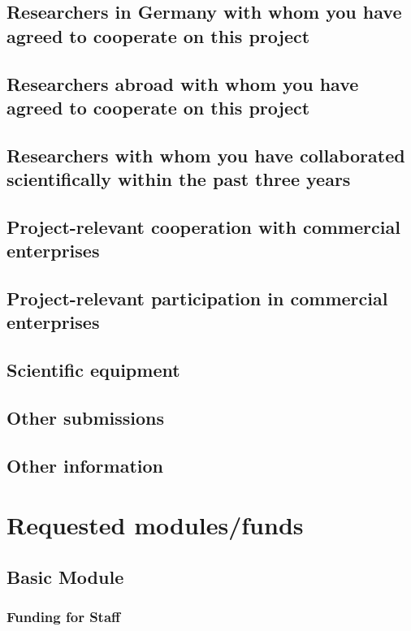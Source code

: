 \documentclass{scrartcl}
\begin{document}
\subsection{Researchers in Germany with whom you have agreed to cooperate on this project}

\subsection{Researchers abroad with whom you have agreed to cooperate on this project}

\subsection{Researchers with whom you have collaborated scientifically within the past three years}

\subsection{Project-relevant cooperation with commercial enterprises}

\subsection{Project-relevant participation in commercial enterprises}

\subsection{Scientific equipment}

\subsection{Other submissions}

\subsection{Other information}


\section{Requested modules/funds}

\subsection{Basic Module}

\subsubsection{Funding for Staff}
\begin{funds}


\end{funds}
\end{document}
